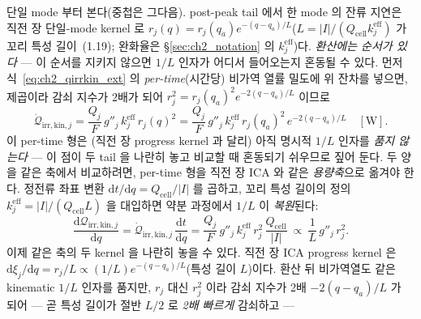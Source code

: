 \documentclass[11pt,a4paper]{article}
\newcommand{\dd}{\mathrm{d}}
\newcommand{\eff}{\mathrm{eff}}
\newcommand{\cell}{\mathrm{cell}}
\newcommand{\irr}{\mathrm{irr}}
\newcommand{\kin}{\mathrm{kin}}
\begin{document}
단일 mode 부터 본다(중첩은 그다음). post-peak tail 에서 한 mode 의 잔류 지연은 직전 장 단일-mode kernel 로
$r_j(q)=r_j(q_a)e^{-(q-q_a)/L}$($L=|I|/(Q_\cell k_j^{\eff})$ 가 꼬리 특성 길이~(1.19); 완화율은
\S\ref{sec:ch2_notation} 의 $k_j^{\eff}$)다. \emph{환산에는 순서가 있다} — 이 순서를 지키지 않으면 $1/L$ 인자가
어디서 들어오는지 혼동될 수 있다. 먼저 식~\eqref{eq:ch2_qirrkin_ext} 의 \emph{per-time}(시간당) 비가역 열률 밀도에
위 잔차를 넣으면, 제곱이라 감쇠 지수가 2배가 되어 $r_j^2=r_j(q_a)^2 e^{-2(q-q_a)/L}$ 이므로
\begin{equation}
\dot{\mathcal Q}_{\irr,\kin,j}=\frac{Q_j}{F}\,g''_j\,k_j^{\eff}\,r_j(q)^2
=\frac{Q_j}{F}\,g''_j\,k_j^{\eff}\,r_j(q_a)^2\,e^{-2(q-q_a)/L}\quad[\mathrm W].
\label{eq:ch2_thermal_single}
\end{equation}
이 per-time 형은 (직전 장 progress kernel 과 달리) 아직 명시적 $1/L$ 인자를 \emph{품지 않는다} — 이 점이 두 tail 을
나란히 놓고 비교할 때 혼동되기 쉬우므로 짚어 둔다. 두 양을 같은 축에서 비교하려면, per-time 형을 직전 장 ICA 와 같은
\emph{용량축}으로 옮겨야 한다. 정전류 좌표 변환 $\dd t/\dd q=Q_\cell/|I|$ 를 곱하고, 꼬리 특성 길이의 정의
$k_j^{\eff}=|I|/(Q_\cell L)$ 을 대입하면 약분 과정에서 $1/L$ 이 \emph{복원}된다:
\begin{equation}
\frac{\dd\mathcal Q_{\irr,\kin,j}}{\dd q}=\dot{\mathcal Q}_{\irr,\kin,j}\,\frac{\dd t}{\dd q}
=\frac{Q_j}{F}\,g''_j\,k_j^{\eff}\,r_j^2\,\frac{Q_\cell}{|I|}
\ \propto\ \frac{1}{L}\,g''_j\,r_j^2.
\label{eq:ch2_thermal_qaxis}
\end{equation}
이제 같은 축의 두 kernel 을 나란히 놓을 수 있다. 직전 장 ICA progress kernel 은 $\dd\xi_j/\dd q=r_j/L\propto
(1/L)e^{-(q-q_a)/L}$(특성 길이 $L$)이다. 환산 뒤 비가역열도 같은 kinematic $1/L$ 인자를 품지만, $r_j$ 대신
$r_j^2$ 이라 감쇠 지수가 2배 $-2(q-q_a)/L$ 가 되어 — 곧 특성 길이가 절반 $L/2$ 로 \emph{2배 빠르게} 감쇠하고 —
\end{document}
